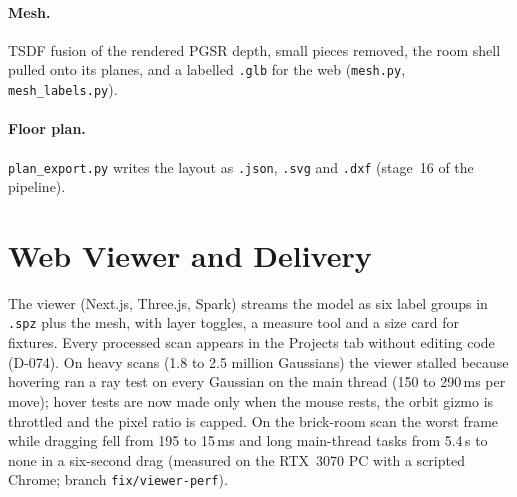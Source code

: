 \paragraph{Mesh.} TSDF fusion of the rendered PGSR depth, small pieces removed, the room shell pulled onto its planes,
and a labelled \texttt{.glb} for the web (\texttt{mesh.py}, \texttt{mesh\_labels.py}).
\paragraph{Floor plan.} \texttt{plan\_export.py} writes the layout as \texttt{.json}, \texttt{.svg} and \texttt{.dxf}
(stage~16 of the pipeline).

\section{Web Viewer and Delivery}
The viewer (Next.js, Three.js, Spark) streams the model as six label groups in \texttt{.spz} plus the mesh, with
layer toggles, a measure tool and a size card for fixtures. Every processed scan appears in the Projects tab without
editing code (D-074). On heavy scans (1.8 to 2.5 million Gaussians) the viewer stalled because hovering ran a ray
test on every Gaussian on the main thread (150 to 290\,ms per move); hover tests are now made only when the mouse
rests, the orbit gizmo is throttled and the pixel ratio is capped. On the brick-room scan the worst frame while
dragging fell from 195 to 15\,ms and long main-thread tasks from 5.4\,s to none in a six-second drag (measured on the
RTX~3070 PC with a scripted Chrome; branch \texttt{fix/viewer-perf}).

